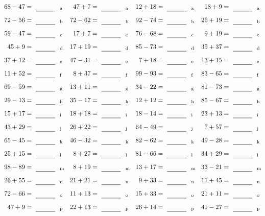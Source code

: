 \documentclass
[
  draft    = true,
  fontsize = 11pt,
  parskip  = half-
]
{scrartcl}
\begin{document}
\clearpage
\begin{align*}
    \pline{68-47}&=\rline{a}
  & \pline{47+7}&=\rline{a}
  & \pline{12+18}&=\rline{a}
  & \pline{18+9}&=\rline{a} \\[1ex]
    \pline{72-56}&=\rline{b}
  & \pline{72-62}&=\rline{b}
  & \pline{92-74}&=\rline{b}
  & \pline{26+19}&=\rline{b} \\[1ex]
    \pline{59-47}&=\rline{c}
  & \pline{17+7}&=\rline{c}
  & \pline{76-68}&=\rline{c}
  & \pline{9+19}&=\rline{c} \\[1ex]
    \pline{45+9}&=\rline{d}
  & \pline{17+19}&=\rline{d}
  & \pline{85-73}&=\rline{d}
  & \pline{35+37}&=\rline{d} \\[1ex]
    \pline{37+12}&=\rline{e}
  & \pline{47-31}&=\rline{e}
  & \pline{7+18}&=\rline{e}
  & \pline{13+15}&=\rline{e} \\[1ex]
    \pline{11+52}&=\rline{f}
  & \pline{8+37}&=\rline{f}
  & \pline{99-93}&=\rline{f}
  & \pline{83-65}&=\rline{f} \\[1ex]
    \pline{69-59}&=\rline{g}
  & \pline{13+11}&=\rline{g}
  & \pline{34-22}&=\rline{g}
  & \pline{81-73}&=\rline{g} \\[1ex]
    \pline{29-13}&=\rline{h}
  & \pline{35-17}&=\rline{h}
  & \pline{12+12}&=\rline{h}
  & \pline{85-67}&=\rline{h} \\[1ex]
    \pline{15+17}&=\rline{i}
  & \pline{18+18}&=\rline{i}
  & \pline{18-14}&=\rline{i}
  & \pline{23+13}&=\rline{i} \\[1ex]
    \pline{43+29}&=\rline{j}
  & \pline{26+22}&=\rline{j}
  & \pline{64-49}&=\rline{j}
  & \pline{7+57}&=\rline{j} \\[1ex]
    \pline{65-45}&=\rline{k}
  & \pline{46-32}&=\rline{k}
  & \pline{82-62}&=\rline{k}
  & \pline{49-28}&=\rline{k} \\[1ex]
    \pline{25+15}&=\rline{l}
  & \pline{8+27}&=\rline{l}
  & \pline{81-66}&=\rline{l}
  & \pline{34+29}&=\rline{l} \\[1ex]
    \pline{98-89}&=\rline{m}
  & \pline{8+19}&=\rline{m}
  & \pline{13+17}&=\rline{m}
  & \pline{33-21}&=\rline{m} \\[1ex]
    \pline{26+55}&=\rline{n}
  & \pline{21+21}&=\rline{n}
  & \pline{9+33}&=\rline{n}
  & \pline{11+45}&=\rline{n} \\[1ex]
    \pline{72-66}&=\rline{o}
  & \pline{11+13}&=\rline{o}
  & \pline{15+33}&=\rline{o}
  & \pline{21+11}&=\rline{o} \\[1ex]
    \pline{47+9}&=\rline{p}
  & \pline{22+13}&=\rline{p}
  & \pline{26+14}&=\rline{p}
  & \pline{41-27}&=\rline{p}
\end{align*}
\end{document}
